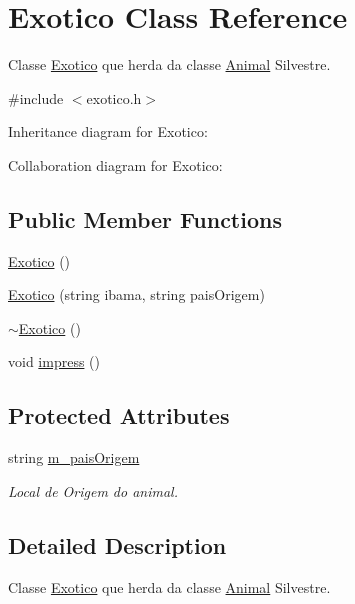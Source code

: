\hypertarget{classExotico}{}\section{Exotico Class Reference}
\label{classExotico}


Classe \hyperlink{classExotico}{Exotico} que herda da classe \hyperlink{classAnimal}{Animal} Silvestre.  




{\ttfamily \#include $<$exotico.\+h$>$}



Inheritance diagram for Exotico\+:


Collaboration diagram for Exotico\+:
\subsection*{Public Member Functions}
\begin{DoxyCompactItemize}
\item 
\hyperlink{classExotico_ae69f9a35c795a2357c43b801386424bb}{Exotico} ()
\item 
\hyperlink{classExotico_a4823ceb226bf90019f9e31e3f66b7ed5}{Exotico} (string ibama, string pais\+Origem)
\item 
\hyperlink{classExotico_ae62d95f6e05e2e259bbe3e7e5b633fb8}{$\sim$\+Exotico} ()
\item 
void \hyperlink{classExotico_a154a739577eca475e8e8451db6971633}{impress} ()
\end{DoxyCompactItemize}
\subsection*{Protected Attributes}
\begin{DoxyCompactItemize}
\item 
string \hyperlink{classExotico_a4ac7dec507f3420f4c96318c22ec6f36}{m\+\_\+pais\+Origem}
\begin{DoxyCompactList}\small\item\em Local de Origem do animal. \end{DoxyCompactList}\end{DoxyCompactItemize}


\subsection{Detailed Description}
Classe \hyperlink{classExotico}{Exotico} que herda da classe \hyperlink{classAnimal}{Animal} Silvestre. 

